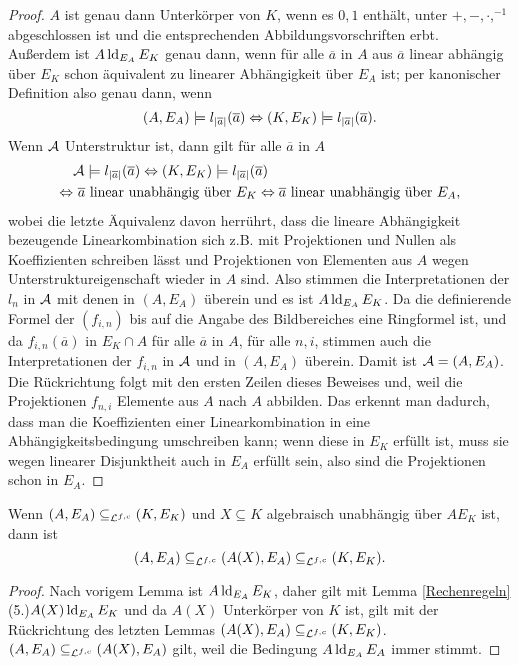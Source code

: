     \begin{proof}
    	$A$ ist genau dann Unterkörper von $K$, wenn es $0,1$ enthält, unter $+,-,\cdot,^{-1}$ abgeschlossen ist und die entsprechenden Abbildungsvorschriften erbt.\\
    	Außerdem ist $A\operatorname{ld}_{E_A}E_K$ genau dann, wenn für alle $\overline{a}$ in $A$ aus $\overline{a}$ linear abhängig über $E_K$ schon äquivalent zu linearer Abhängigkeit über $E_A$ ist; per kanonischer Definition also genau dann, wenn $$(A,E_A)\models l_{{\left| \overline{a} \right|}}(\overline{a}) \Leftrightarrow (K,E_K)\models l_{{\left| \overline{a} \right|}}(\overline{a}).$$
    	Wenn $\mathcal{A}$ Unterstruktur ist, dann gilt für alle $\overline{a}$ in $A$
    	\begin{align*}
    	&\mathcal{A}\models l_{{\left| \overline{a} \right|}}(\overline{a})\Leftrightarrow(K,E_K)\models l_{{\left| \overline{a} \right|}}(\overline{a})\\
    	\Leftrightarrow&\ \overline{a}\text{ linear unabhängig über }E_K\Leftrightarrow\overline{a}\text{ linear unabhängig über }E_A,
    	\end{align*}\newpage
    	wobei die letzte Äquivalenz davon herrührt, dass die lineare Abhängigkeit bezeugende Linearkombination sich z.B. mit Projektionen und Nullen als Koeffizienten schreiben lässt und Projektionen von Elementen aus $A$ wegen Unterstruktureigenschaft wieder in $A$ sind. Also stimmen die Interpretationen der $l_n$ in $\mathcal{A}$ mit denen in $(A,E_A)$ überein und es ist $A\operatorname{ld}_{E_A}E_K$. Da die definierende Formel der $(f_{i,n})$ bis auf die Angabe des Bildbereiches eine Ringformel ist, und da $f_{i,n}(\overline{a})$ in $E_K\cap A$ für alle $\overline{a}$ in $A$, für alle $n,i$, stimmen auch die Interpretationen der $f_{i,n}$ in $\mathcal{A}$ und in $(A,E_A)$ überein. Damit ist $\mathcal{A}=(A,E_A)$.\\
    	Die Rückrichtung folgt mit den ersten Zeilen dieses Beweises und, weil die Projektionen $f_{n,i}$ Elemente aus $A$ nach $A$ abbilden. Das erkennt man dadurch, dass man die Koeffizienten einer Linearkombination in eine Abhängigkeitsbedingung umschreiben kann; wenn diese in $E_K$ erfüllt ist, muss sie wegen linearer Disjunktheit auch in $E_A$ erfüllt sein, also sind die Projektionen schon in $E_A$.
    \end{proof}
    
    \begin{lemma}\label{transz Erw}
    	Wenn $(A,E_A)\subseteq_{\mathcal{L}^{f,c}}(K,E_K)$ und $X\subseteq K$ algebraisch unabhängig über $AE_K$ ist, dann ist $$(A,E_A)\subseteq_{\mathcal{L}^{f,c}}(A(X),E_A)\subseteq_{\mathcal{L}^{f,c}}(K,E_K).$$
    \end{lemma}
    \begin{proof}
    	Nach vorigem Lemma ist $A\operatorname{ld}_{E_A}E_K$, daher gilt mit Lemma \ref{Rechenregeln} (5.)\linebreak$A(X)\operatorname{ld}_{E_A}E_K$ und da $A(X)$ Unterkörper von $K$ ist, gilt mit der Rückrichtung des letzten Lemmas $(A(X),E_A)\subseteq_{\mathcal{L}^{f,c}}(K,E_K)$.\\
    	$(A,E_A)\subseteq_{\mathcal{L}^{f,c}}(A(X),E_A)$ gilt, weil die Bedingung $A\operatorname{ld}_{E_A} E_A$ immer stimmt.
    \end{proof}
    
